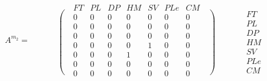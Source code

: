 \begin{equation*}
A^{m_2}=\begin{matrix}\text{ }\\\left.\phantom{\begin{matrix}\mathit{FT}\\\mathit{PL}\\\mathit{DP}\\\mathit{HM}\\\mathit{SV}\\\mathit{PLe}\\\mathit{CM}\end{matrix}}\right(\end{matrix}\begin{matrix}\mathit{FT}&\mathit{PL}&\mathit{DP}&\mathit{HM}&\mathit{SV}&\mathit{PLe}&\mathit{CM}\\0&0&0&0&0&0&0\\0&0&0&0&0&0&0\\0&0&0&0&0&0&0\\0&0&0&0&1&0&0\\0&0&0&1&0&0&0\\0&0&0&0&0&0&0\\0&0&0&0&0&0&0\end{matrix}\begin{matrix}\text{ }\\\left)\phantom{\begin{matrix}\mathit{FT}\\\mathit{PL}\\\mathit{DP}\\\mathit{HM}\\\mathit{SV}\\\mathit{PLe}\\\mathit{CM}\end{matrix}}\right.\end{matrix}\begin{matrix}\text{ }\\\mathit{FT}\\\mathit{PL}\\\mathit{DP}\\\mathit{HM}\\\mathit{SV}\\\mathit{PLe}\\\mathit{CM}\end{matrix}
\end{equation*}

\bigskip

